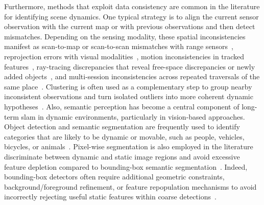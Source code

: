 Furthermore, methods that exploit data consistency are common in the literature
for identifying scene dynamics. One typical strategy is to align the current
sensor observation with the current map or with previous observations and then
detect mismatches. Depending on the sensing modality, these spatial
inconsistencies manifest as scan-to-map or scan-to-scan mismatches with range
sensors~\cite{dayoub:ras:2011,walcott-bryant:iros:2012,saarinen:ijrr:2013,lazaro:iros:2018,boniardi:ras:2019,zhang:acc:2019,kim:icra:2022,deng:ram:2023,stefanini:sensors:2023,hroob:ras:2024,hroob:ral:2024,li:tim:2025,zhu:tim:2025,yang:ral:2024},
reprojection errors with visual
modalities~\cite{wu:cvci:2022,liu:scic:2022,du:tvcg:2022,wang:icra:2019,wang:tim:2025},
motion inconsistencies in tracked
features~\cite{wang:icra:2019,xing:jfr:2022,liu:scic:2022,cheng:ral:2025,hu:tcsvt:2025,jia:tcsvt:2025,wang:tim:2025},
ray-tracing discrepancies that reveal free-space discrepancies or newly added
objects~\cite{biber-duckett:ijrr:2009,saarinen:ijrr:2013,pomerleau:icra:2014,biswas-veloso:ras:2017,lazaro:iros:2018,zhang:acc:2019,ding:tits:2020,thomas:icra:2022,stefanini:sensors:2023},
and multi-session inconsistencies across repeated traversals of the same
place~\cite{ding:tits:2020,kim:icra:2022,yang:ral:2024}.
Clustering is often used as a complementary step to group nearby inconsistent
observations and turn isolated outliers into more coherent dynamic
hypotheses~\cite{bacca:ras:2013,einhorn-gross:ras:2015,pan:sensors:2019,ding:tits:2020,wang:ras:2024,hu:tcsvt:2025,zhu:tim:2025}.
Also, semantic perception has become a central component of long-term \gls{slam}
in dynamic environments, particularly in vision-based approaches.
Object detection and semantic segmentation are frequently used to identify
categories that are likely to be dynamic or movable, such as people, vehicles,
bicycles, or animals~\cite{yang:sensors:2020,yue:icra:2020,zhu:icra:2021,xing:jfr:2022,chen:itsc:2022,soares:jint:2023,hu:tcsvt:2025}.
Pixel-wise segmentation is also employed in the literature discriminate between
dynamic and static image regions and avoid excessive feature depletion
compared to bounding-box semantic
segmentation~\cite{bescos:ral:2018,wang:icra:2019,ganti-waslander:crv:2019,song:iros:2019,singh:itsc:2021,guo-liu:robio:2021,yu:acait:2023,jia:tcsvt:2025,wang:tim:2025,cheng:ral:2025}.
Indeed, bounding-box detectors
often require additional geometric constraints, background/foreground refinement,
or feature repopulation mechanisms to avoid incorrectly rejecting useful
static features within coarse detections~\cite{soares:jint:2023}.

